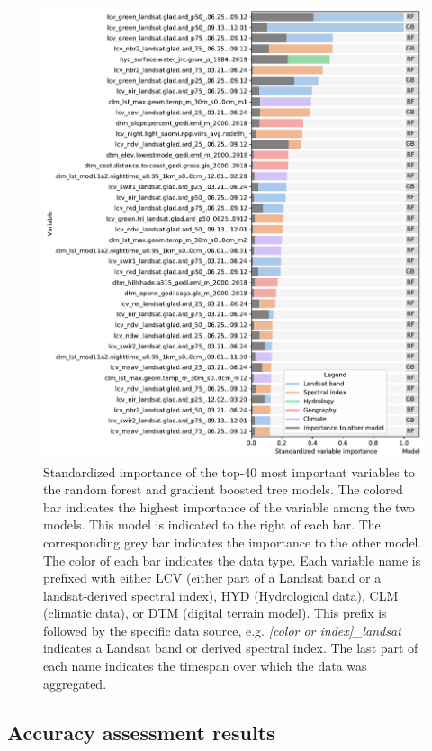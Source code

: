     \begin{figure}[!hp]
    \centering
    \includegraphics[width=\textwidth]{figs_03/results_variable_importance.pdf}
    \caption{Standardized importance of the top-40 most important variables to the random forest and gradient boosted tree models. The colored bar indicates the highest importance of the variable among the two models. This model is indicated to the right of each bar. The corresponding grey bar indicates the importance to the other model. The color of each bar indicates the data type. Each variable name is prefixed with either LCV (either part of a Landsat band or a landsat-derived spectral index), HYD (Hydrological data), CLM (climatic data), or DTM (digital terrain model). This prefix is followed by the specific data source, e.g. \emph{[color or index]\_landsat} indicates a Landsat band or derived spectral index. The last part of each name indicates the timespan over which the data was aggregated.}
    \label{fig:variable_importance}
    \end{figure}
        

\subsection*{Accuracy assessment results}

